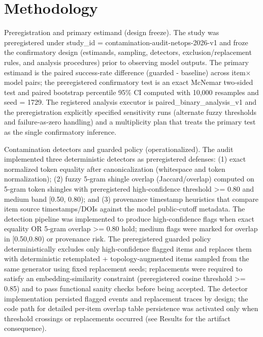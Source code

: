 \documentclass[conference]{IEEEtran}
\begin{document}
\section{Methodology}
Preregistration and primary estimand (design freeze). The study was preregistered under study\_id = contamination-audit-netops-2026-v1 and froze the confirmatory design (estimands, sampling, detectors, exclusion/replacement rules, and analysis procedures) prior to observing model outputs. The primary estimand is the paired success‑rate difference (guarded - baseline) across item\ensuremath{\times}model pairs; the preregistered confirmatory test is an exact McNemar two‑sided test and paired bootstrap percentile 95\% CI computed with 10,000 resamples and seed = 1729. The registered analysis executor is paired\_binary\_analysis\_v1 and the preregistration explicitly specified sensitivity runs (alternate fuzzy thresholds and failure‑as‑zero handling) and a multiplicity plan that treats the primary test as the single confirmatory inference.

Contamination detectors and guarded policy (operationalized). The audit implemented three deterministic detectors as preregistered defenses: (1) exact normalized token equality after canonicalization (whitespace and token normalization); (2) fuzzy 5‑gram shingle overlap (Jaccard/overlap) computed on 5‑gram token shingles with preregistered high‑confidence threshold >= 0.80 and medium band [0.50, 0.80); and (3) provenance timestamp heuristics that compare item source timestamps/DOIs against the model public‑cutoff metadata. The detection pipeline was implemented to produce high‑confidence flags when exact equality OR 5‑gram overlap >= 0.80 hold; medium flags were marked for overlap in [0.50,0.80) or provenance risk. The preregistered guarded policy deterministically excludes only high‑confidence flagged items and replaces them with deterministic retemplated + topology‑augmented items sampled from the same generator using fixed replacement seeds; replacements were required to satisfy an embedding‑similarity constraint (preregistered cosine threshold >= 0.85) and to pass functional sanity checks before being accepted. The detector implementation persisted flagged events and replacement traces by design; the code path for detailed per‑item overlap table persistence was activated only when threshold crossings or replacements occurred (see Results for the artifact consequence).
\end{document}
